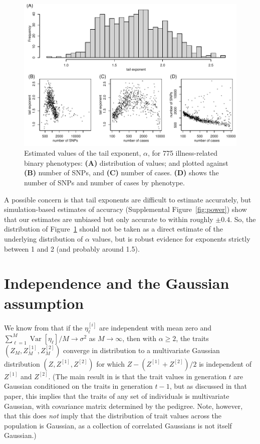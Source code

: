 \documentclass{article}
\newcommand{\var}{\mathop{\mbox{Var}}}
\newcommand{\1}{\mathbbm{1}}
\theoremstyle{remark}
\theoremstyle{definition}
\begin{document}
\begin{figure}
    \begin{center}
    \includegraphics{snp_effects/results_10}
    \end{center}
    \caption{
        Estimated values of the tail exponent, $\alpha$,
        for 775 illness-related binary phenotypes:
        \textbf{(A)} distribution of values; and plotted against
        \textbf{(B)} number of SNPs, and
        \textbf{(C)} number of cases.
        \textbf{(D)} shows the number of SNPs and number of cases by phenotype.
        \label{fig:exponent_hist}
    }
\end{figure}

A possible concern is that tail exponents are difficult to estimate accurately, 
but simulation-based estimates of accuracy (Supplemental Figure~\ref{fig:power})
show that our estimates are unbiased but only accurate to within roughly $\pm 0.4$.
So, the distribution of Figure~\ref{fig:exponent_hist} should not be taken as
a direct estimate of the underlying distribution of $\alpha$ values,
but is robust evidence for exponents strictly between 1 and 2 (and probably around 1.5).

\section{Independence and the Gaussian assumption}

We know from \citet{barton2017infinitesimal}  
that if the $\eta^{[i]}_\ell$ are
independent with mean zero and $\sum_{\ell=1}^M \var[\eta_\ell]/M \to \sigma^2$ as $M \to \infty$,
then with $\alpha \ge 2$,
the traits $(Z_M, Z_M^{[1]}, Z_M^{[2]})$ converge in distribution to a multivariate Gaussian distribution
$(Z, Z^{[1]}, Z^{[2]})$ for which $Z - (Z^{[1]} + Z^{[2]})/2$ is independent of $Z^{[1]}$ and $Z^{[2]}$.
(The main result in \citet{barton2017infinitesimal} is that the trait values in generation $t$
are Gaussian conditioned on the traits in generation $t-1$,
but as discussed in that paper,
this implies that the traits of any set of individuals is multivariate Gaussian,
with covariance matrix determined by the pedigree.
Note, however, that this does \emph{not} imply that the distribution of trait values
across the population is Gaussian, as a collection of correlated Gaussians is not itself Gaussian.)
\end{document}
